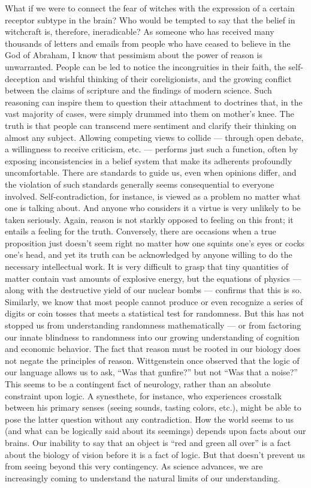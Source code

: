 \documentclass[a4paper,14pt]{extarticle}
\begin{document}
What if we were to connect the fear of witches with the expression of a certain receptor subtype in the brain?
Who would be tempted to say that the belief in witchcraft is, therefore, ineradicable?
As someone who has received many thousands of letters and emails from people who have ceased to believe in the God of Abraham, I know that pessimism about the power of reason is unwarranted.
People can be led to notice the incongruities in their faith, the self-deception and wishful thinking of their coreligionists, and the growing conflict between the claims of scripture and the findings of modern science.
Such reasoning can inspire them to question their attachment to doctrines that, in the vast majority of cases, were simply drummed into them on mother’s knee.
The truth is that people can transcend mere sentiment and clarify their thinking on almost any subject.
Allowing competing views to collide --- through open debate, a willingness to receive criticism, etc. --- performs just such a function, often by exposing inconsistencies in a belief system that make its adherents profoundly uncomfortable.
There are standards to guide us, even when opinions differ, and the violation of such standards generally seems consequential to everyone involved.
Self-contradiction, for instance, is viewed as a problem no matter what one is talking about.
And anyone who considers it a virtue is very unlikely to be taken seriously.
Again, reason is not starkly opposed to feeling on this front;
it entails a feeling for the truth.
Conversely, there are occasions when a true proposition just doesn’t seem right no matter how one squints one’s eyes or cocks one’s head, and yet its truth can be acknowledged by anyone willing to do the necessary intellectual work.
It is very difficult to grasp that tiny quantities of matter contain vast amounts of explosive energy, but the equations of physics --- along with the destructive yield of our nuclear bombs --- confirms that this is so.
Similarly, we know that most people cannot produce or even recognize a series of digits or coin tosses that meets a statistical test for randomness.
But this has not stopped us from understanding randomness mathematically --- or from factoring our innate blindness to randomness into our growing understanding of cognition and economic behavior.
The fact that reason must be rooted in our biology does not negate the principles of reason.
Wittgenstein once observed that the logic of our language allows us to ask, ``Was that gunfire?'' but not ``Was that a noise?''
This seems to be a contingent fact of neurology, rather than an absolute constraint upon logic.
A synesthete, for instance, who experiences crosstalk between his primary senses (seeing sounds, tasting colors, etc.), might be able to pose the latter question without any contradiction.
How the world seems to us (and what can be logically said about its seemings) depends upon facts about our brains.
Our inability to say that an object is ``red and green all over'' is a fact about the biology of vision before it is a fact of logic.
But that doesn’t prevent us from seeing beyond this very contingency.
As science advances, we are increasingly coming to understand the natural limits of our understanding.
\end{document}
